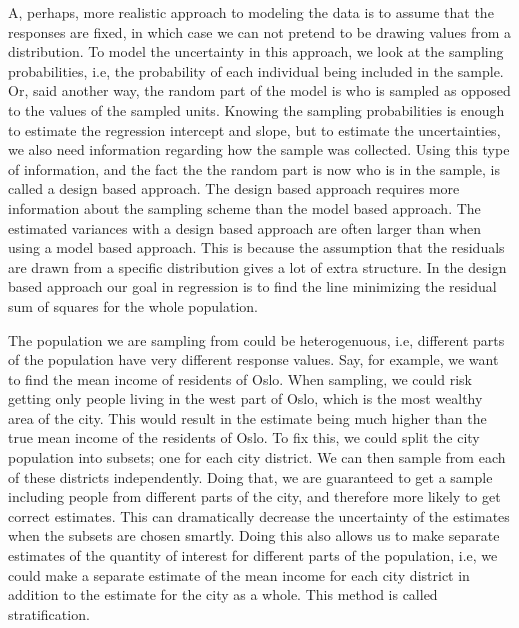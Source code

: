 \documentclass{article}
\begin{document}
A, perhaps, more realistic approach to modeling the data is to assume that the
responses are fixed, in which case we can not pretend to be drawing
values from a distribution. To model the uncertainty in this approach, we look at
the sampling probabilities, i.e, the probability of each individual being
included in the sample. Or, said another way, the random part of the model
is who is sampled as opposed to the values of the sampled units. Knowing the sampling probabilities is enough to
estimate the regression intercept and slope, but to estimate the uncertainties,
we also need information regarding how the sample was collected.
Using this type of information, and the fact the the random part is now who is in
the sample, is called a design based approach. The design based approach requires
more information about the sampling scheme than the model based approach. The
estimated variances with a design based approach are often larger than when
using a model based approach. This is because the
assumption that the residuals are drawn from a specific distribution gives a
lot of extra structure. In the design based approach our goal in regression is
to find the line minimizing the residual sum of squares for the whole population.

The population we are sampling from could be heterogenuous, i.e, different
parts of the population have very different response values. Say, for example, we want
to find the mean income of residents of Oslo. When sampling, we could risk
getting only people living in the west part of Oslo, which is the most wealthy
area of the city. This would result in the estimate being much higher than the true
mean income of the residents of Oslo. To fix this, we could split
the city population into subsets; one for each city district. We can then sample
from each of these districts independently. Doing that, we are guaranteed to get
a sample including people from different parts of the city, and therefore
more likely to get correct estimates. This can dramatically decrease the
uncertainty of the estimates when the subsets are chosen smartly. Doing this also allows us to make
separate estimates of the quantity of interest for different parts of the
population, i.e, we could make a separate estimate of the mean income for each city
district in addition to the estimate for the city as a whole. This method is
called stratification.
\end{document}
